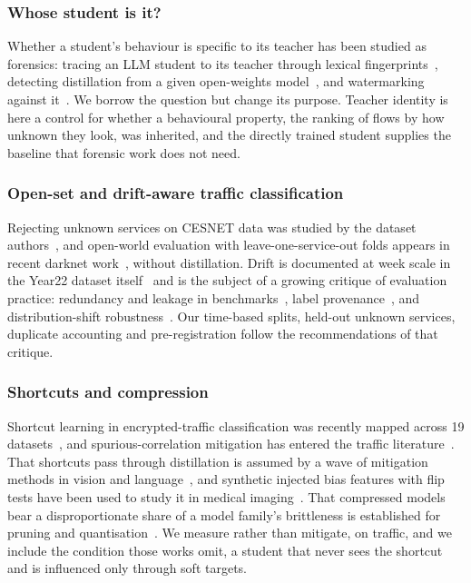 \documentclass[journal]{IEEEtran}
\begin{document}
\subsubsection*{Whose student is it?}
Whether a student's behaviour is specific to its teacher has been studied as forensics: tracing an LLM student to its teacher through lexical fingerprints~\cite{whotaughtyou}, detecting distillation from a given open-weights model~\cite{kddetection2025}, and watermarking against it~\cite{antidistill,tokenprint}. We borrow the question but change its purpose. Teacher identity is here a control for whether a behavioural property, the ranking of flows by how unknown they look, was inherited, and the directly trained student supplies the baseline that forensic work does not need.

\subsubsection*{Open-set and drift-aware traffic classification}
Rejecting unknown services on CESNET data was studied by the dataset authors~\cite{luxemburk2022reject}, and open-world evaluation with leave-one-service-out folds appears in recent darknet work~\cite{darknetopenworld}, without distillation. Drift is documented at week scale in the Year22 dataset itself~\cite{luxemburk2024year22} and is the subject of a growing critique of evaluation practice: redundancy and leakage in benchmarks~\cite{ntccrisis}, label provenance~\cite{soklabels}, and distribution-shift robustness~\cite{unialign,colossus}. Our time-based splits, held-out unknown services, duplicate accounting and pre-registration follow the recommendations of that critique.

\subsubsection*{Shortcuts and compression}
Shortcut learning in encrypted-traffic classification was recently mapped across 19 datasets~\cite{biasseeker}, and spurious-correlation mitigation has entered the traffic literature~\cite{tddm}. That shortcuts pass through distillation is assumed by a wave of mitigation methods in vision and language~\cite{asd2026,saopd2026,iga2026}, and synthetic injected bias features with flip tests have been used to study it in medical imaging~\cite{medshortcutkd}. That compressed models bear a disproportionate share of a model family's brittleness is established for pruning and quantisation~\cite{hooker2020,mtforget,robustnessdistill}. We measure rather than mitigate, on traffic, and we include the condition those works omit, a student that never sees the shortcut and is influenced only through soft targets.
\end{document}
